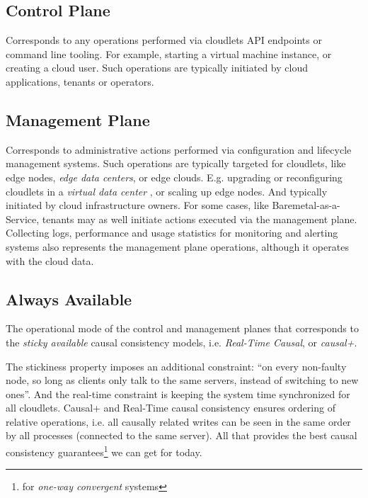 \documentclass[conference]{IEEEtran}
\begin{document}
\subsection{Control Plane}

Corresponds to any operations performed via cloudlets API endpoints or command
line tooling. For example, starting a virtual machine instance, or creating a
cloud user. Such operations are typically initiated by cloud applications,
tenants or operators.

\subsection{Management Plane}

Corresponds to administrative actions performed via configuration and lifecycle
management systems. Such operations are typically targeted for cloudlets, like
edge nodes, \textit{edge data centers}\cite{b3}, or edge clouds. E.g.
upgrading or reconfiguring cloudlets in a \textit{virtual data center}
\cite{b3}, or scaling up edge nodes. And typically initiated by cloud
infrastructure owners. For some cases, like Baremetal-as-a-Service, tenants
may as well initiate actions executed via the management plane. Collecting
logs, performance and usage statistics for monitoring and alerting systems also
represents the management plane operations, although it operates with the cloud
data.

\subsection{Always Available}

The operational mode of the control and management planes that corresponds to
the \textit{sticky available}\cite{b4} causal consistency models,
i.e. \textit{Real-Time Causal}\cite{b2}, or \textit{causal+}\cite{b1}.

The stickiness property imposes an additional constraint\cite{b4}: ``on every
non-faulty node, so long as clients only talk to the same servers, instead of
switching to new ones''. And the real-time constraint is keeping the system
time synchronized for all cloudlets. Causal+ and Real-Time causal consistency
ensures ordering of relative operations, i.e. all causally related writes can
be seen in the same order by all processes (connected to the same server). All
that provides the best causal consistency guarantees\footnote{for
\textit{one-way convergent}\cite{b2} systems} we can get for today.
\end{document}
